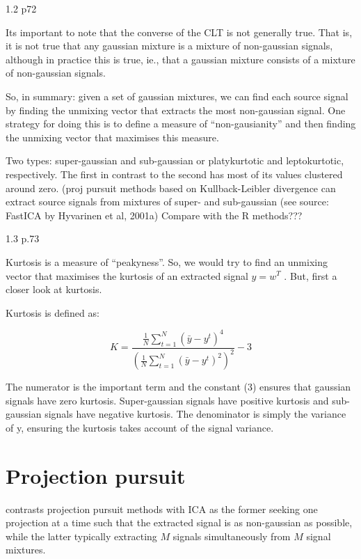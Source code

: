\documentclass{article}
\begin{document}
1.2 p72

Its important to note that the converse of the CLT is not generally true. That is, it is not true that any gaussian mixture is a mixture of non-gaussian signals, although in practice this is true, ie., that a gaussian mixture consists of a mixture of non-gaussian signals. 

So, in summary: given a set of gaussian mixtures, we can find each source signal by finding the unmixing vector that extracts the most non-gaussian signal. One strategy for doing this is to define a measure of “non-gausianity” and then finding the unmixing vector that maximises this measure.

Two types: super-gaussian and sub-gaussian or platykurtotic and leptokurtotic, respectively. The first in contrast to the second has most of its values clustered around zero. (proj pursuit methods based on Kullback-Leibler divergence can extract source signals from mixtures of super- and sub-gaussian (see source: FastICA by Hyvarinen et al, 2001a) Compare with the R methods???

1.3 p.73

Kurtosis is a measure of “peakyness”. So, we would try to find an unmixing vector that maximises the kurtosis of an extracted signal $y=w^{T}$ . But, first a closer look at kurtosis.

Kurtosis is defined as:

$$K=\frac{\frac{1}{N}\sum_{t=1}^{N}(\bar{y}-y^{t})^{4}}{(\frac{1}{N}\sum_{t=1}^{N}(\bar{y}-y^{t})^{2})^{2}}-3$$

The numerator is the important term and the constant (3) ensures that gaussian signals have zero kurtosis. Super-gaussian signals have positive kurtosis and sub-gaussian signals have negative kurtosis. The denominator is simply the variance of y, ensuring the kurtosis takes account of the signal variance.

\section{Projection pursuit}

\cite{stone2004independent} contrasts projection pursuit methods with ICA as the former seeking one projection at a time such that the extracted signal is as non-gaussian as possible, while the latter typically extracting $M$ signals simultaneously from $M$ signal mixtures.



\end{document}
